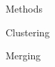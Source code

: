 \documentclass{acm_proc_article-me}
\begin{document}
\begin{section}{Methods}
\begin{subsection}{Clustering}
\begin{subsubsection}{Merging}



\end{subsubsection}
\end{subsection}
\end{section}
\end{document}
